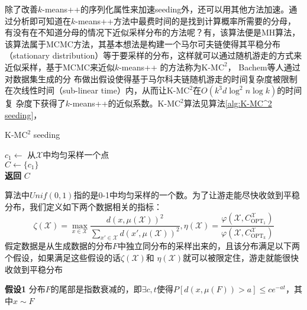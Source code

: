 除了改善$k$-means++的序列化属性来加速seeding外，还可以用其他方法加速。通过分析即可知道在$k$-means++方法中最费时间的是找到计算概率所需要的分母，有没有在不知道分母的情况下近似采样分布的方法呢？有，该算法便是MH算法，该算法属于MCMC方法，其基本想法是构建一个马尔可夫链使得其平稳分布（stationary distribution）等于要采样的分布，这样就可以通过随机游走的方式来近似采样，基于MCMC来近似$k$-means++
的方法称为K-M$\text{C}^2$， Bachem等人通过对数据集生成的分
布做出假设使得基于马尔科夫链随机游走的时间复杂度被限制在次线性时间（sub-linear time）内，从而让K-M$\text{C}^2$在$O(k^3 d \log^2 n \log k)$的时间复
杂度下获得了$k$-means++的近似系数。K-M$\text{C}^2$算法见算法\ref{alg:K-MC^2 seeding}，
\begin{algorithm}
    \caption{K-M$\text{C}^2$ seeding}\label{alg:K-MC^2 seeding}
    $c_1 \gets $ 从$\mathcal{X}$中均匀采样一个点 \\
    $C \gets \{c_1\}$ \\
    \textbf{返回} $C$ %
\end{algorithm}
算法中$Unif(0,1)$指的是0-1中均匀采样的一个数。为了让游走能尽快收敛到平稳分布，我们定义如下两个数据相关的指标：
\begin{equation*}
\zeta(\mathcal{X}) = \max\limits_{x \in \mathcal{X}}\frac{d(x,\mu(\mathcal{X}))^2}{\sum_{x' \in \mathcal{X}}d(x',\mu(\mathcal{X}))^2}, \eta(\mathcal{X}) = \frac{\varphi(\mathcal{X},C_{\text{OPT}_1}^{\mathcal{X}})}{\varphi(\mathcal{X},C_{\text{OPT}_k}^{\mathcal{X}})}
\end{equation*}
假定数据是从生成数据的分布$F$中独立同分布的采样出来的，且该分布满足以下两个假设，如果满足这些假设的话$\zeta(\mathcal{X})$和
$\eta(\mathcal{X})$就可以被限定住，游走就能很快收敛到平稳分布

\textbf{假设1} 分布$F$的尾部是指数衰减的，即$\exists c,t $使得$P[d(x,\mu(F))>a]\leq ce^{-at}$，其中$x\sim F$ 

